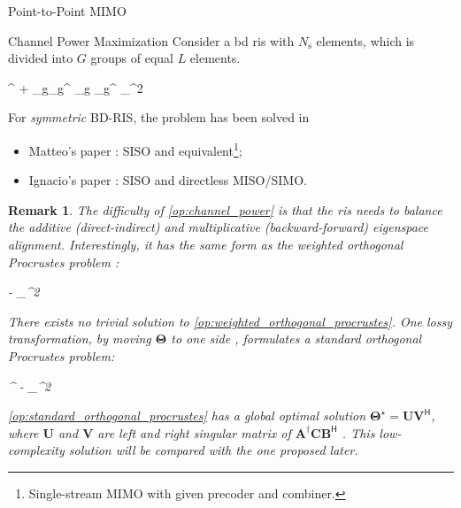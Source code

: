\documentclass[journal]{IEEEtran}
\newtheorem{remark}{Remark}
\begin{document}
\begin{section}{Point-to-Point MIMO}
	\begin{subsection}{Channel Power Maximization}
		Consider a \gls{bd} \gls{ris} with $N_\mathrm{s}$ elements, which is divided into $G$ groups of equal $L$ elements.
		\begin{maxi!}
			{\scriptstyle{\mathbf{\Theta}}}{\left\lVert {}^ + \sum_g\nolimits {}_g^ \mathbf{\Theta}_g _g^ \right\rVert _^2}{\label{op:channel_power}}{}
		\end{maxi!}
		For \emph{symmetric} BD-RIS, the problem has been solved in
		\begin{itemize}
			\item Matteo's paper \cite{Nerini2023}: SISO and equivalent\footnote{Single-stream MIMO with given precoder and combiner.};
			\item Ignacio's paper \cite{Santamaria2023}: SISO and directless MISO/SIMO.
		\end{itemize}

		\begin{remark}
			The difficulty of \eqref{op:channel_power} is that the \gls{ris} needs to balance the additive (direct-indirect) and multiplicative (backward-forward) eigenspace alignment.
			Interestingly, it has the same form as the \emph{weighted orthogonal Procrustes problem} \cite{Gower2004}:
			\begin{mini!}
				{\scriptstyle{\mathbf{\Theta}}}{\lVert {} -  \rVert _^2}{\label{op:weighted_orthogonal_procrustes}}{}
			\end{mini!}
			There exists no trivial solution to \eqref{op:weighted_orthogonal_procrustes}.
			One lossy transformation, by moving $\mathbf{\Theta}$ to one side \cite{Bell2003}, formulates a standard orthogonal Procrustes problem:
			\begin{mini!}
				{\scriptstyle{\mathbf{\Theta}}}{\lVert {}^\dagger {} -  \rVert _^2}{\label{op:standard_orthogonal_procrustes}}{}
				\addConstraint{\mathbf{\Theta}^\mathsf{H} \mathbf{\Theta}=\mathbf{I}}{}{}
			\end{mini!}
			\eqref{op:standard_orthogonal_procrustes} has a global optimal solution $\mathbf{\Theta}^\star = \mathbf{U} \mathbf{V}^\mathsf{H}$, where $\mathbf{U}$ and $\mathbf{V}$ are left and right singular matrix of $\mathbf{\mathbf{A}^\dagger \mathbf{C} \mathbf{B}^\mathsf{H}}$ \cite{Golub2013}.
			This low-complexity solution will be compared with the one proposed later.
		\end{remark}


\end{subsection}
\end{section}
\end{document}
